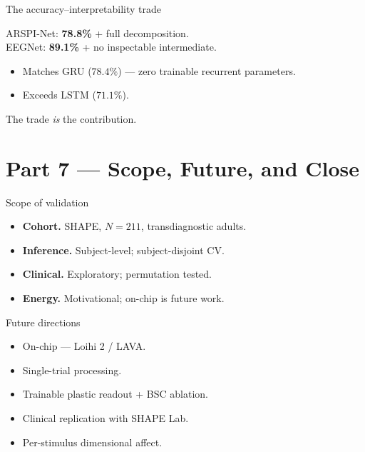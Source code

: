 \documentclass[11pt,aspectratio=169]{beamer}
\begin{document}
\begin{frame}{The accuracy--interpretability trade}
  \vspace{0.6em}
  \begin{center}\large
    ARSPI-Net: \textbf{78.8\%} + full decomposition.\\[0.4em]
    EEGNet: \textbf{89.1\%} + no inspectable intermediate.
  \end{center}
  \vspace{0.6em}
  \begin{itemize}
    \item Matches GRU ($78.4\%$) --- zero trainable recurrent parameters.
    \item Exceeds LSTM ($71.1\%$).
  \end{itemize}
  \vspace{0.4em}
  \begin{center}\color{sbnavy}
    The trade \emph{is} the contribution.
  \end{center}
\end{frame}

\section{Part 7 --- Scope, Future, and Close}

\begin{frame}{Scope of validation}
  \vspace{0.6em}
  \begin{itemize}
    \item \textbf{Cohort.} SHAPE, $N=211$, transdiagnostic adults.
    \item \textbf{Inference.} Subject-level; subject-disjoint CV.
    \item \textbf{Clinical.} Exploratory; permutation tested.
    \item \textbf{Energy.} Motivational; on-chip is future work.
  \end{itemize}
\end{frame}

\begin{frame}{Future directions}
  \vspace{0.6em}
  \begin{itemize}
    \item On-chip --- Loihi 2 / LAVA.
    \item Single-trial processing.
    \item Trainable plastic readout + BSC ablation.
    \item Clinical replication with SHAPE Lab.
    \item Per-stimulus dimensional affect.
  \end{itemize}
\end{frame}
\end{document}
